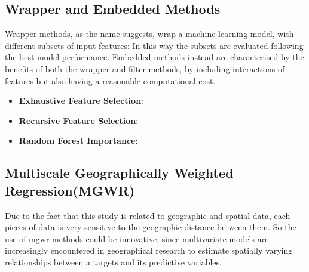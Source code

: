 \subsection{Wrapper and Embedded Methods}
Wrapper methods, as the name suggests, wrap a machine learning model, with different subsets of input features: In this way the subsets are  evaluated following the best model performance.
Embedded methods instead are characterised by the benefits of both the wrapper and filter methods, by including interactions of features but also having a reasonable computational cost.
\begin{itemize}
\item \textbf{Exhaustive Feature Selection}:
\item \textbf{Recursive Feature Selection}:
\item \textbf{Random Forest Importance}:
\end{itemize}
\subsection{Multiscale Geographically Weighted Regression(MGWR)}
Due to the fact that this study is related to geographic and spatial data, each pieces of data is very sensitive to the geographic distance between them. So the use of mgwr methods could be innovative, since multivariate models are increasingly encountered in geographical research to estimate spatially varying relationships between a targets and its predictive variables.



